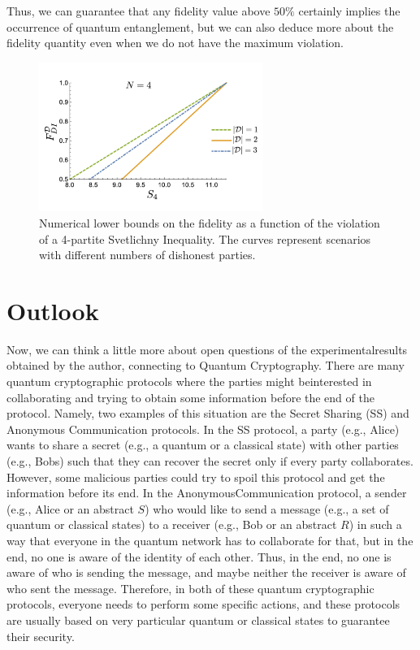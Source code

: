 \documentclass[12pt]{article}
\begin{document}
    \noindent Thus, we can guarantee that any fidelity value above $50\%$ certainly implies the occurrence of quantum entanglement, but we can also deduce more about the fidelity quantity even when we do not have the maximum violation.
    \vspace{-3ex}
    \begin{figure}[ht]
        \centering
        \includegraphics[width=0.65\textwidth]{figures/images/img-3.pdf}
        \vspace{-3.5ex}
        \caption{\centering Numerical lower bounds on the fidelity as a function of the violation of a 4-partite Svetlichny Inequality. The curves represent scenarios with different numbers of dishonest parties.}
    \end{figure}

    \clearpage
    
    \section{Outlook}
    \label{sec:outlook}

    Now, we can think a little more about open questions of the experimental\break results obtained by the author, connecting to Quantum Cryptography. There are many quantum cryptographic protocols where the parties might be\break interested in collaborating and trying to obtain some information before the end of the protocol. Namely, two examples of this situation are the Secret Sharing (SS) and Anonymous Communication protocols. In the SS protocol, a party (e.g., Alice) wants to share a secret (e.g., a quantum or a classical state) with other parties (e.g., Bobs) such that they can recover the secret only if every party collaborates. However, some malicious parties could try to spoil this protocol and get the information before its end. In the Anonymous\break Communication protocol, a sender (e.g., Alice or an abstract $S$) who would like to send a message (e.g., a set of quantum or classical states) to a receiver (e.g., Bob or an abstract $R$) in such a way that everyone in the quantum network has to collaborate for that, but in the end, no one is aware of the identity of each other. Thus, in the end, no one is aware of who is sending the message, and maybe neither the receiver is aware of who sent the message. Therefore, in both of these quantum cryptographic protocols, everyone needs to perform some specific actions, and these protocols are usually based on very particular quantum or classical states to guarantee their security.
\end{document}
